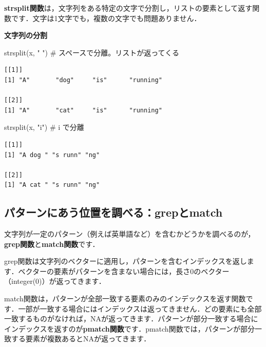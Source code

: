 \documentclass[
  letterpaper,
  DIV=11,
  numbers=noendperiod]{scrreprt}
\newenvironment{Shaded}{\begin{snugshade}}{\end{snugshade}}
\newcommand{\CommentTok}[1]{\textcolor[rgb]{0.37,0.37,0.37}{#1}}
\newcommand{\FunctionTok}[1]{\textcolor[rgb]{0.28,0.35,0.67}{#1}}
\newcommand{\NormalTok}[1]{\textcolor[rgb]{0.00,0.23,0.31}{#1}}
\newcommand{\StringTok}[1]{\textcolor[rgb]{0.13,0.47,0.30}{#1}}
\begin{document}
\textbf{strsplit関数}は，文字列をある特定の文字で分割し，リストの要素として返す関数です．文字は1文字でも，複数の文字でも問題ありません．

\textbf{文字列の分割}

\begin{Shaded}
\begin{Highlighting}[]
\FunctionTok{strsplit}\NormalTok{(x, }\StringTok{" "}\NormalTok{) }\CommentTok{\# スペースで分離。リストが返ってくる}
\end{Highlighting}
\end{Shaded}

\begin{verbatim}
[[1]]
[1] "A"       "dog"     "is"      "running"

[[2]]
[1] "A"       "cat"     "is"      "running"
\end{verbatim}

\begin{Shaded}
\begin{Highlighting}[]
\FunctionTok{strsplit}\NormalTok{(x, }\StringTok{"i"}\NormalTok{) }\CommentTok{\# i で分離}
\end{Highlighting}
\end{Shaded}

\begin{verbatim}
[[1]]
[1] "A dog " "s runn" "ng"    

[[2]]
[1] "A cat " "s runn" "ng"    
\end{verbatim}

\hypertarget{ux30d1ux30bfux30fcux30f3ux306bux3042ux3046ux4f4dux7f6eux3092ux8abfux3079ux308bgrepux3068match}{%
\subsection{パターンにあう位置を調べる：grepとmatch}\label{ux30d1ux30bfux30fcux30f3ux306bux3042ux3046ux4f4dux7f6eux3092ux8abfux3079ux308bgrepux3068match}}

文字列が一定のパターン（例えば英単語など）を含むかどうかを調べるのが，\textbf{grep関数}と\textbf{match関数}です．

grep関数は文字列のベクターに適用し，パターンを含むインデックスを返します．ベクターの要素がパターンを含まない場合には，長さ0のベクター（integer(0)）が返ってきます．

match関数は，パターンが全部一致する要素のみのインデックスを返す関数です．一部が一致する場合にはインデックスは返ってきません．どの要素にも全部一致するものがなければ，NAが返ってきます．パターンが部分一致する場合にインデックスを返すのが\textbf{pmatch関数}です．pmatch関数では，パターンが部分一致する要素が複数あるとNAが返ってきます．
\end{document}
